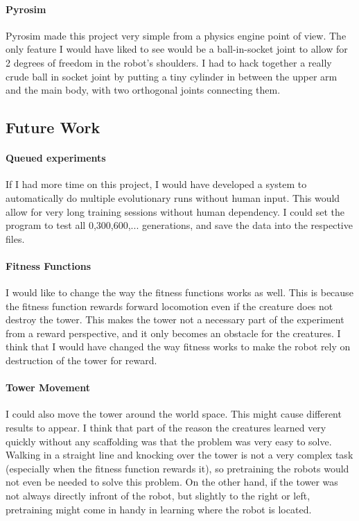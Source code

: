 \documentclass[12pt, a4paper]{article}
\begin{document}
\paragraph{Pyrosim} Pyrosim made this project very simple from a physics engine point of view. The only feature I would have liked to see would be a ball-in-socket joint to allow for 2 degrees of freedom in the robot's shoulders. I had to hack together a really crude ball in socket joint by putting a tiny cylinder in between the upper arm and the main body, with two orthogonal joints connecting them. 


\subsection{Future Work}
\paragraph{Queued experiments} If I had more time on this project, I would have developed a system to automatically do multiple evolutionary runs without human input. This would allow for very long training sessions without human dependency. I could set the program to test all 0,300,600,... generations, and save the data into the respective files.

\paragraph{Fitness Functions} I would like to change the way the fitness functions works as well. This is because the fitness function rewards forward locomotion even if the creature does not destroy the tower. This makes the tower not a necessary part of the experiment from a reward perspective, and it only becomes an obstacle for the creatures. I think that I would have changed the way fitness works to make the robot rely on destruction of the tower for reward.

\paragraph{Tower Movement} I could also move the tower around the world space. This might cause different results to appear. I think that part of the reason the creatures learned very quickly without any scaffolding was that the problem was very easy to solve. Walking in a straight line and knocking over the tower is not a very complex task (especially when the fitness function rewards it), so pretraining the robots would not even be needed to solve this problem. On the other hand, if the tower was not always directly infront of the robot, but slightly to the right or left, pretraining might come in handy in learning where the robot is located.
\end{document}
